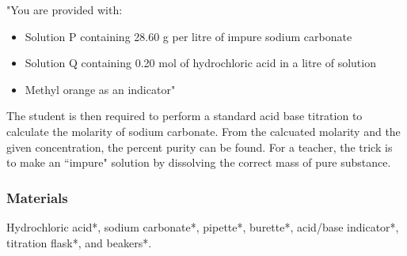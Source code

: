 "You are provided with:
\begin{itemize}
\item{Solution P containing 28.60 g per litre of impure sodium carbonate}
\item{Solution Q containing 0.20 mol of hydrochloric acid in a litre of solution}
\item{Methyl orange as an indicator}"
\end{itemize}
The student is then required to perform a standard acid base titration to calculate the molarity of sodium carbonate. From the calcuated molarity and the given concentration, the percent purity can be found. For a teacher, the trick is to make an ``impure" solution by dissolving the correct mass of pure substance. 
\subsubsection{Materials}
Hydrochloric acid*, sodium carbonate*, pipette*, burette*, acid/base indicator*, titration flask*, and beakers*.

